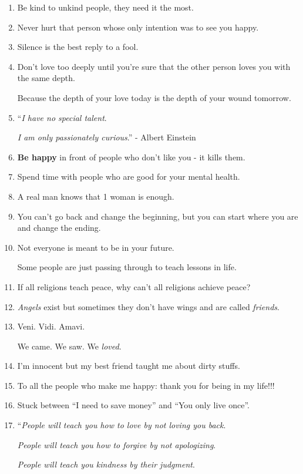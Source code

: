 \documentclass{article}
\numberwithin{equation}{section}
\begin{document}
\begin{enumerate}
    It's not all the time someone cares.
    \item Be kind to unkind people, they need it the most.
    \item Never hurt that person whose only intention was to see you happy.
    \item Silence is the best reply to a fool.
    \item Don't love too deeply until you're sure that the other person loves you with the same depth.
    
    Because the depth of your love today is the depth of your wound tomorrow.
    \item ``\textit{I have no special talent}.
    
    \textit{I am only passionately curious}.'' - Albert Einstein
    \item \textbf{Be happy} in front of people who don't like you - it kills them.
    \item Spend time with people who are good for your mental health.
    \item A real man knows that 1 woman is enough.
    \item You can't go back and change the beginning, but you can start where you are and change the ending.
    \item Not everyone is meant to be in your future.
    
    Some people are just passing through to teach lessons in life.
    \item If all religions teach peace, why can't all religions achieve peace?
    \item \textit{Angels} exist but sometimes they don't have wings and are called \textit{friends}.
    \item Veni. Vidi. Amavi.
    
    We came. We saw. We \textit{loved}.
    \item I'm innocent but my best friend taught me about dirty stuffs.
    \item To all the people who make me happy: thank you for being in my life!!!
    \item Stuck between ``I need to save money'' and ``You only live once''.
    \item ``\textit{People will teach you how to love by not loving you back}.
    
    \textit{People will teach you how to forgive by not apologizing}.
    
    \textit{People will teach you kindness by their judgment}.
    

\end{enumerate}
\end{document}
